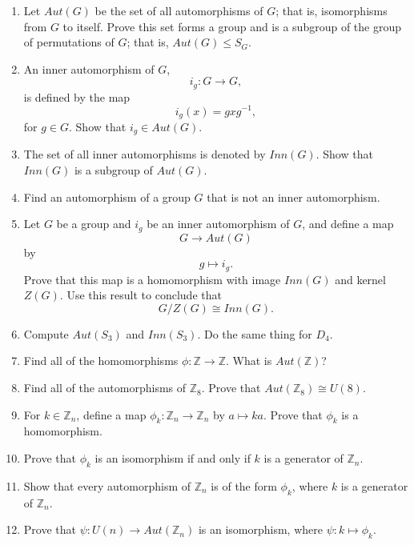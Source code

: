 
{\small
\begin{enumerate}
 
 
\item
Let $Aut(G)$ be the set of all automorphisms of $G$; that is,
isomorphisms from $G$ to itself. Prove this set forms a group and is a
subgroup of the group of permutations of $G$; that is, $Aut(G) \leq S_G$. 
 
 
\item
An {\bfi inner automorphism\/} of $G$,
\[
i_g : G \rightarrow G,
\]
is defined by the map
\[
i_g(x) = g x g^{-1},
\]
for $g \in G$. Show that $i_g \in Aut(G)$.
 
 
\item
The set of all inner automorphisms is denoted by $Inn(G)$. Show that
$Inn(G)$ is a subgroup of $Aut(G)$. 
 
 
\item
Find an automorphism of a group $G$ that is not an inner automorphism.
 
 
\item
Let $G$ be a group and $i_g$ be an inner automorphism of $G$, and
define a map 
\[
G \rightarrow Aut(G)
\]
by
\[
g \mapsto i_g.
\]
Prove that this map is a homomorphism with image $Inn(G)$ and kernel
$Z(G)$. Use this result to conclude that 
\[
G/Z(G) \cong Inn(G).
\]
 
 
\item
Compute $Aut(S_3)$ and $Inn(S_3)$.  Do the same thing for $D_4$.
 
 
\item
Find all of the homomorphisms $\phi : {\mathbb Z} \rightarrow {\mathbb Z}$.
What is $Aut({\mathbb Z})$? 
 
 
\item
Find all of the automorphisms of ${\mathbb Z}_8$.  Prove that $Aut({\mathbb
Z}_8) \cong U(8)$. 
 
 
\item
For $k \in {\mathbb Z}_n$, define a map $\phi_k : {\mathbb Z}_n \rightarrow
{\mathbb Z}_n$ by $a \mapsto ka$.  Prove that $\phi_k$ is a homomorphism. 
 
 
\item
Prove that $\phi_k$ is an isomorphism if and only if $k$ is a generator
of ${\mathbb Z}_n$. 
 
 
\item
Show that every automorphism of ${\mathbb Z}_n$ is of the form $\phi_k$,
where $k$ is a generator of ${\mathbb Z}_n$. 
 
 
\item
Prove that $\psi : U(n) \rightarrow Aut({\mathbb Z}_n)$ is an
isomorphism, where $\psi : k \mapsto \phi_k$. 
 
 
\end{enumerate}
}

\sagesection
 
 
 
 
